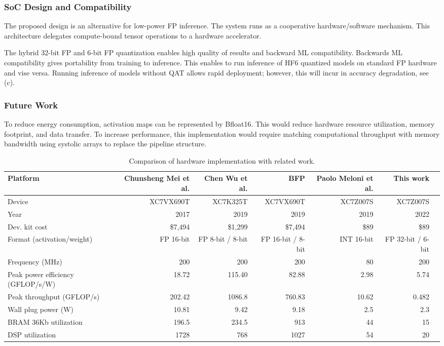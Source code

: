 \subsubsection{SoC Design and Compatibility}
The proposed design is an alternative for low-power FP inference. The system runs as a cooperative hardware/software mechanism. This architecture delegates compute-bound tensor operations to a hardware accelerator.

The hybrid 32-bit FP and 6-bit FP quantization enables high quality of results and backward ML compatibility. Backwards ML compatibility gives portability from training to inference. This enables to run inference of HF6 quantized models on standard FP hardware and vise versa. Running inference of models without QAT allows rapid deployment; however, this will incur in accuracy degradation, see (c).

\subsubsection{Future Work}
To reduce energy consumption, activation maps can be represented by Bfloat16. This would reduce hardware resource utilization, memory footprint, and data transfer. To increase performance, this implementation would require matching computational throughput with memory bandwidth using systolic arrays to replace the pipeline structure.
\begin{table}[!t]\centering
	\caption{Comparison of hardware implementation with related work.}\label{tab:comparison}
	\scriptsize
	\begin{tabular}{lrrrrrr}\toprule
		Platform &Chunsheng Mei et al. \cite{mei2017200mhz} &Chen Wu et al. \cite{wu2021low} &BFP \cite{lian2019high} &Paolo Meloni et al. \cite{meloni2019cnn} &This work \\\midrule
		Device &XC7VX690T &XC7K325T &XC7VX690T &XC7Z007S &XC7Z007S \\
		Year &2017 &2019 &2019 &2019 &2022 \\
		Dev. kit cost &\$7,494 &\$1,299 &\$7,494 &\$89 &\$89 \\
		Format (activation/weight) &FP 16-bit &FP 8-bit / 8-bit &FP 16-bit / 8-bit &INT 16-bit &FP 32-bit / 6-bit \\
		Frequency (MHz) &200 &200 &200 &80 &200 \\
		Peak power efficiency (GFLOP/s/W) &18.72 &115.40 &82.88 &2.98 &5.74 \\
		Peak throughput (GFLOP/s) & 202.42 & 1086.8 & 760.83 &  10.62& 0.482\\
		Wall plug power (W) &10.81 &9.42 &9.18 &2.5 &2.3 \\
		BRAM 36Kb utilization &196.5 &234.5 &913 &44 &15 \\
		DSP utilization &1728 &768 &1027 &54 &20 \\
		\bottomrule
	\end{tabular}
\end{table}